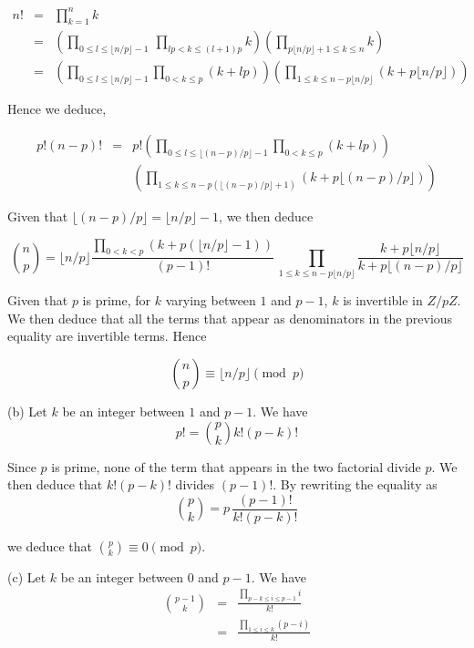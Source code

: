\documentclass[a4paper,12pt]{article}
\newcommand{\subpar}[1]{\medskip \noindent (#1)}
\begin{document}
\begin{eqnarray*}
  n! &=& \prod_{k=1}^n k \\
  &=& \left( \prod_{0 \le l \le \lfloor n/p\rfloor - 1}\ \prod_{lp <
    k\le (l+1)p} k \right) \left( \prod_{p \lfloor n/p\rfloor + 1\le k \le
    n} k \right) \\
  &=& \left( \prod_{0\le l \le \lfloor n/p\rfloor - 1} \prod_{0 < k
    \le p} (k+lp) \right) \left( \prod_{1 \le k \le n - p \lfloor n/p \rfloor}
  (k+p\lfloor n/p\rfloor) \right)
\end{eqnarray*}

Hence we deduce,

\begin{eqnarray*}
  p!(n-p)! &=& p! \left( \prod_{0\le l \le \lfloor (n-p)/p\rfloor-1}
  \prod_{0<k\le p} (k+lp)\right) \\ &&
  \left( \prod_{1\le k\le n-p(\lfloor (n-p)/p\rfloor+1)} (k + p \lfloor
  (n-p)/p\rfloor)\right)
\end{eqnarray*}

Given that $\lfloor (n-p)/p \rfloor = \lfloor n/p\rfloor - 1$, we then
deduce


\[  {n \choose p} = \lfloor n/p\rfloor \frac{\prod_{0< k < p}(k + p(\lfloor
    n/p\rfloor - 1))}{(p-1)!}\,
  \prod_{1\le k\le n-p\lfloor n/p\rfloor }
  \frac{k+p\lfloor n/p\rfloor}{k+p\lfloor (n-p)/p\rfloor} \]

Given that $p$ is prime, for $k$ varying between $1$ and $p-1$, $k$ is
invertible in $Z/pZ$. We then deduce that all the terms that appear as
denominators in the previous equality are invertible terms.  Hence

\[ {n \choose p} \equiv \lfloor n/p\rfloor \pmod p\]

\subpar{b} Let $k$ be an integer between $1$ and $p-1$.  We have
\[ p! = {p \choose k} k! (p-k)! \]

Since $p$ is prime, none of the term that appears in the two
factorial divide $p$.  We then deduce that $k! (p-k)!$ divides
$(p-1)!$. By rewriting the equality as
\[ {p \choose k} = p\,\frac{(p-1)!}{k!(p-k)!}\]

we deduce that ${p \choose k} \equiv 0 \pmod p$.

\subpar{c} Let $k$ be an integer between $0$ and $p-1$. We have
\begin{eqnarray*}
  {{p-1} \choose k} &=& \frac{\prod_{p-k \le i\le p-1} i}{k!} \\
  &=& \frac{\prod_{1\le i\le k} (p-i)}{k!}
\end{eqnarray*}
\end{document}
